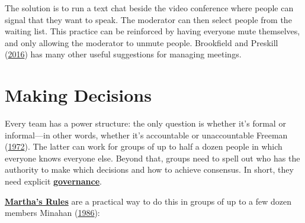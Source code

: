 \documentclass[
]{krantz}
\newcommand{\gref}[2]{\hyperlink{#2}{\textbf{#1}}}
\begin{document}
The solution is to run a text chat beside the video conference
where people can signal that they want to speak.
The moderator can then select people from the waiting list.
This practice can be reinforced by having everyone mute themselves,
and only allowing the moderator to unmute people.
Brookfield and Preskill (\protect\hyperlink{ref-Broo2016}{2016}) has many other useful suggestions for managing meetings.

\hypertarget{teams-martha}{%
\section{Making Decisions}\label{teams-martha}}

Every team has a power structure:
the only question is
whether it's formal or informal---in other words,
whether it's accountable or unaccountable Freeman (\protect\hyperlink{ref-Free1972}{1972}).
The latter can work for groups of up to half a dozen people
in which everyone knows everyone else.
Beyond that,
groups need to spell out
who has the authority to make which decisions
and how to achieve consensus.
In short,
they need explicit \gref{governance}{governance}.

\gref{Martha's Rules}{marthas\_rules} are a practical way to do this
in groups of up to a few dozen members Minahan (\protect\hyperlink{ref-Mina1986}{1986}):
\end{document}
